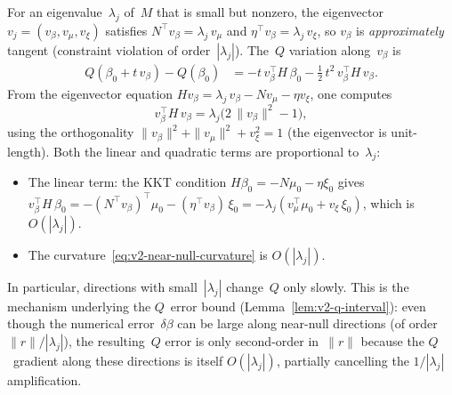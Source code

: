 \begin{remark}%
\label{rem:v2-near-null-q}
For an eigenvalue~$\lambda_j$ of~$M$ that is
small but nonzero, the eigenvector
$v_j = (v_\beta, v_\mu, v_\xi)$ satisfies
$N^\top v_\beta = \lambda_j\,v_\mu$ and
$\eta^\top v_\beta = \lambda_j\,v_\xi$,
so $v_\beta$ is \emph{approximately} tangent
(constraint violation of order~$|\lambda_j|$).
The~$Q$ variation along~$v_\beta$ is
\begin{align*}
  Q(\beta_0 + t\,v_\beta) - Q(\beta_0)
  &= -t\,v_\beta^\top H\,\beta_0
    - \tfrac{1}{2}\,t^2\,v_\beta^\top H\,v_\beta.
\end{align*}
From the eigenvector equation
$Hv_\beta = \lambda_j\,v_\beta
  - N v_\mu - \eta v_\xi$,
one computes
\begin{equation}\label{eq:v2-near-null-curvature}
  v_\beta^\top H\,v_\beta
  = \lambda_j\bigl(2\,\|v_\beta\|^2 - 1\bigr),
\end{equation}
using the orthogonality
$\|v_\beta\|^2 + \|v_\mu\|^2 + v_\xi^2 = 1$
(the eigenvector is unit-length).
Both the linear and quadratic terms are
proportional to~$\lambda_j$:
\begin{itemize}
\item The linear term:
  the KKT condition
  $H\beta_0 = -N\mu_0 - \eta\xi_0$ gives
  $v_\beta^\top H\,\beta_0
    = -(N^\top v_\beta)^\top\mu_0
      - (\eta^\top v_\beta)\,\xi_0
    = -\lambda_j(v_\mu^\top\mu_0
      + v_\xi\,\xi_0)$,
  which is $O(|\lambda_j|)$.
\item The curvature~\eqref{eq:v2-near-null-curvature}
  is $O(|\lambda_j|)$.
\end{itemize}
In particular, directions with small~$|\lambda_j|$
change~$Q$ only slowly.
This is the mechanism underlying the $Q$~error bound
(Lemma~\ref{lem:v2-q-interval}): even though the
numerical error~$\delta\beta$ can be large along
near-null directions (of order~$\|r\| / |\lambda_j|$),
the resulting~$Q$ error is only second-order in~$\|r\|$
because the $Q$~gradient along these directions
is itself $O(|\lambda_j|)$,
partially cancelling the $1/|\lambda_j|$ amplification.
\end{remark}

